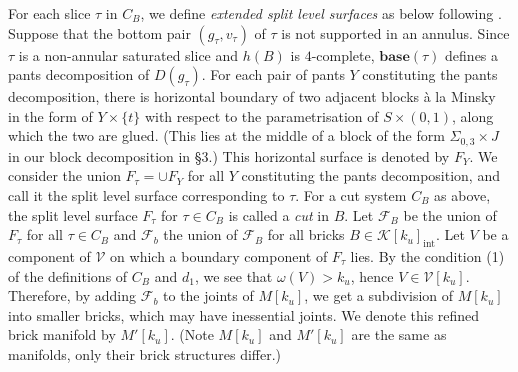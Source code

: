 \documentclass{amsart}
\theoremstyle{definition}
\numberwithin{figure}{section}
\numberwithin{equation}{section}
\newcommand{\base}{\mathbf{base}}
\def\ck{\mathcal{K}}
\def\cv{\mathcal{V}}
\def\Sg{\Sigma}
\def\Sg{\Sigma}
\begin{document}
For each slice $\tau$ in $C_B$, we define  {\em extended split level surfaces} as below following \cite{bcm}.
Suppose that the bottom pair $(g_\tau, v_\tau)$ of $\tau$ is not supported in an annulus.
Since $\tau$ is a non-annular saturated slice and $h(B)$ is $4$-complete,  $\base(\tau)$ defines a pants decomposition of $D(g_\tau)$.
For each pair of pants $Y$ constituting the pants decomposition, there is horizontal boundary of two adjacent blocks \`{a} la Minsky in the form of $Y \times \{t\}$ with respect to the parametrisation of $S \times (0,1)$, along which the two are glued.
(This lies at the middle of a block of the form $\Sg_{0,3} \times J$ in our block decomposition in \S 3.)
This horizontal surface is denoted by $F_Y$.
We consider the union $F_\tau=\cup F_Y$ for all $Y$ constituting the pants decomposition, and call it the split level surface corresponding to $\tau$.
For a cut system $C_B$ as above, the split level surface $F_\tau$ for $\tau \in C_B$ is called a {\em cut} in $B$.
\smallskip
Let $\mathcal F_B$ be the union of $F_\tau$ for all $\tau \in C_B$ and $\mathcal F_b$ the union of $\mathcal F_B$ for all bricks $B \in \ck[k_u]_\mathrm{int}$.
Let $V$ be a component of $\cv$ on which a boundary component of $F_\tau$ lies.
By the condition (1) of the definitions of $C_B$ and $d_1$, we see that $\omega(V) > k_u$, hence $V \in \cv[k_u]$.
Therefore, by adding $\mathcal F_b$ to the joints of $M[k_u]$, we get a subdivision of $M[k_u]$ into smaller bricks, which may have inessential joints.
We denote this refined brick manifold by $M'[k_u]$.
(Note $M[k_u]$ and $M'[k_u]$ are the same as manifolds, only their brick structures differ.)
\end{document}

